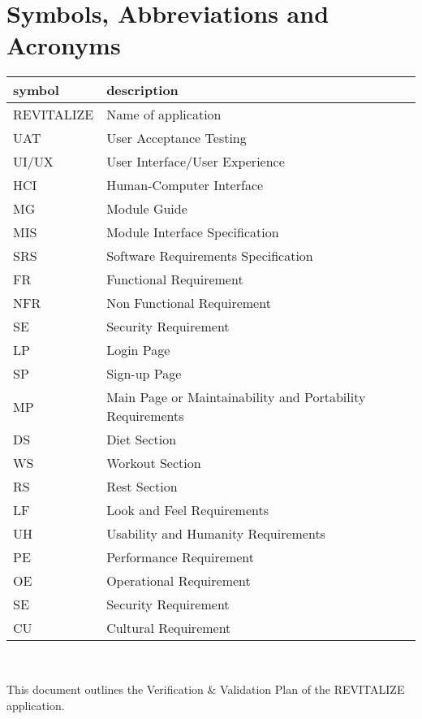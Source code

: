 \documentclass[12pt, titlepage]{article}
\begin{document}
\newpage

\section{Symbols, Abbreviations and Acronyms}

\renewcommand{\arraystretch}{1.2}
\begin{tabular}{l l} 
	\toprule		
	\textbf{symbol} & \textbf{description}\\
	\midrule 
	REVITALIZE & Name of application\\
	UAT & User Acceptance Testing\\
	UI/UX & User Interface/User Experience\\
	HCI & Human-Computer Interface\\
	MG & Module Guide\\
	MIS & Module Interface Specification\\
	SRS & Software Requirements Specification\\
	FR & Functional Requirement\\
	NFR & Non Functional Requirement\\
	SE & Security Requirement\\
	LP & Login Page\\
	SP & Sign-up Page\\
	MP & Main Page or Maintainability and Portability Requirements\\
	DS & Diet Section\\
	WS & Workout Section\\
	RS & Rest Section\\
	LF & Look and Feel Requirements\\
	UH & Usability and Humanity Requirements\\
	PE & Performance Requirement\\
	OE & Operational Requirement\\
	SE & Security Requirement\\
	CU & Cultural Requirement\\
	\bottomrule
\end{tabular}\\


\newpage


\noindent This document outlines the Verification \& Validation Plan of the REVITALIZE application.
\end{document}
